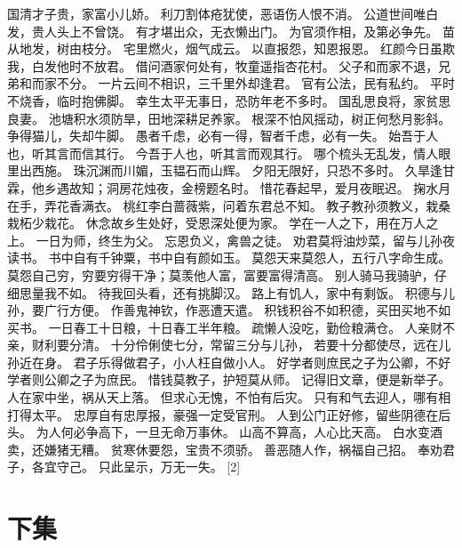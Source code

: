 \documentclass[12pt,UTF8]{ctexbook}
\begin{document}
国清才子贵，家富小儿娇。
利刀割体疮犹使，恶语伤人恨不消。
公道世间唯白发，贵人头上不曾饶。
有才堪出众，无衣懒出门。
为官须作相，及第必争先。
苗从地发，树由枝分。
宅里燃火，烟气成云。
以直报怨，知恩报恩。
红颜今日虽欺我，白发他时不放君。
借问酒家何处有，牧童遥指杏花村。
父子和而家不退，兄弟和而家不分。
一片云间不相识，三千里外却逢君。
官有公法，民有私约。
平时不烧香，临时抱佛脚。
幸生太平无事日，恐防年老不多时。
国乱思良将，家贫思良妻。
池塘积水须防旱，田地深耕足养家。
根深不怕风摇动，树正何愁月影斜。
争得猫儿，失却牛脚。
愚者千虑，必有一得，智者千虑，必有一失。
始吾于人也，听其言而信其行。
今吾于人也，听其言而观其行。
哪个梳头无乱发，情人眼里出西施。
珠沉渊而川媚，玉韫石而山辉。
夕阳无限好，只恐不多时。
久旱逢甘霖，他乡遇故知；洞房花烛夜，金榜题名时。
惜花春起早，爱月夜眠迟。
掬水月在手，弄花香满衣。
桃红李白蔷薇紫，问着东君总不知。
教子教孙须教义，栽桑栽柘少栽花。
休念故乡生处好，受恩深处便为家。
学在一人之下，用在万人之上。
一日为师，终生为父。
忘恩负义，禽兽之徒。
劝君莫将油炒菜，留与儿孙夜读书。
书中自有千钟粟，书中自有颜如玉。
莫怨天来莫怨人，五行八字命生成。
莫怨自己穷，穷要穷得干净；莫羡他人富，富要富得清高。
别人骑马我骑驴，仔细思量我不如。
待我回头看，还有挑脚汉。
路上有饥人，家中有剩饭。
积德与儿孙，要广行方便。
作善鬼神钦，作恶遭天遣。
积钱积谷不如积德，买田买地不如买书。
一日春工十日粮，十日春工半年粮。
疏懒人没吃，勤俭粮满仓。
人亲财不亲，财利要分清。
十分伶俐使七分，常留三分与儿孙，
若要十分都使尽，远在儿孙近在身。
君子乐得做君子，小人枉自做小人。
好学者则庶民之子为公卿，不好学者则公卿之子为庶民。
惜钱莫教子，护短莫从师。
记得旧文章，便是新举子。
人在家中坐，祸从天上落。
但求心无愧，不怕有后灾。
只有和气去迎人，哪有相打得太平。
忠厚自有忠厚报，豪强一定受官刑。
人到公门正好修，留些阴德在后头。
为人何必争高下，一旦无命万事休。
山高不算高，人心比天高。
白水变酒卖，还嫌猪无糟。
贫寒休要怨，宝贵不须骄。
善恶随人作，祸福自己招。
奉劝君子，各宜守己。
只此呈示，万无一失。 [2]

\chapter{下集}
\end{document}
